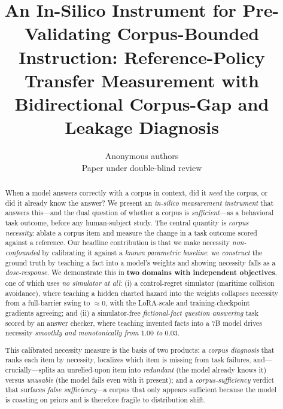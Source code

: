 \documentclass{article}
\title{An In-Silico Instrument for Pre-Validating Corpus-Bounded Instruction:
Reference-Policy Transfer Measurement with Bidirectional Corpus-Gap and Leakage Diagnosis}
\author{Anonymous authors \\ Paper under double-blind review}
\begin{document}
\maketitle

\begin{abstract}
When a model answers correctly with a corpus in context, did it \emph{need} the corpus, or
did it already know the answer? We present an \emph{in-silico measurement instrument} that
answers this---and the dual question of whether a corpus is \emph{sufficient}---as a
behavioral task outcome, before any human-subject study. The central quantity is
\emph{corpus necessity}: ablate a corpus item and measure the change in a task outcome scored
against a reference. Our headline contribution is that we make necessity \emph{non-confounded}
by calibrating it against a \emph{known parametric baseline}: we \emph{construct} the ground
truth by teaching a fact into a model's weights and showing necessity falls as a
\emph{dose-response}. We demonstrate this in \textbf{two domains with independent objectives},
one of which uses \emph{no simulator at all}: (i) a control-regret simulator (maritime
collision avoidance), where teaching a hidden charted hazard into the weights collapses
necessity from a full-barrier swing to $\approx 0$, with the LoRA-scale and training-checkpoint
gradients agreeing; and (ii) a simulator-free \emph{fictional-fact question answering} task
scored by an answer checker, where teaching invented facts into a 7B model drives necessity
\emph{smoothly and monotonically from $1.00$ to $0.03$}.

This calibrated necessity measure is
the basis of two products: a \emph{corpus diagnosis} that ranks each item by necessity,
localizes which item is missing from task failures, and---crucially---splits an unrelied-upon
item into \emph{redundant} (the model already knows it) versus \emph{unusable} (the model
fails even with it present); and a \emph{corpus-sufficiency} verdict that surfaces
\emph{false sufficiency}---a corpus that only appears sufficient because the model is coasting
on priors and is therefore fragile to distribution shift.


\end{abstract}
\end{document}
